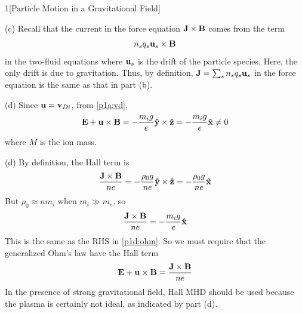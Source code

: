 \documentclass[12pt]{article}
\begin{document}
\begin{problem}{1}[Particle Motion in a Gravitational Field]
\begin{solution}
(c) Recall that the current in the force equation $\vb{J}\times\vb{B}$ comes
from the term
\begin{equation}
    n_sq_s\vb{u}_s\times\vb{B} 
\end{equation}
in the two-fluid equations where $\vb{u}_s$ is the drift of the particle
species. Here, the only drift is due to gravitation. Thus, by definition,
$\vb{J}=\sum_sn_sq_s\vb{u}_s$ in the force equation is the same as that in part 
(b).

(d) Since $\vb{u}=\vb{v}_{Di}$, from \eqref{p1a:vd},
\begin{equation}\label{p1d:ohm}
    \vb{E}+\vb{u}\times\vb{B}=-\frac{m_ig}{e}\vb{\hat{y}}\times\vb{\hat{z}}=-\frac{m_ig}{e}\vb{\hat{x}}
    \neq0
\end{equation}
where $M$ is the ion mass.

(d) By definition, the Hall term is
\begin{equation}
    \frac{\vb{J}\times\vb{B}}{ne}
    =-\frac{\rho_0g}{ne}\vb{\hat{y}}\times\vb{\hat{z}}
    =-\frac{\rho_0g}{ne}\vb{\hat{x}}
\end{equation}
But $\rho_0\approx nm_i$ when $m_i\gg m_e$, so
\begin{equation}
    \frac{\vb{J}\times\vb{B}}{ne}=-\frac{m_ig}{e}\vb{\hat{x}} 
\end{equation}
This is the same as the RHS in \eqref{p1d:ohm}. So we must require that the
generalized Ohm's law have the Hall term
\begin{equation}
    \vb{E}+\vb{u}\times\vb{B}=\frac{\vb{J}\times\vb{B}}{ne} 
\end{equation}
In the presence of strong gravitational field, Hall MHD should be used because
the plasma is certainly not ideal, as indicated by part (d).
\end{solution}
\end{problem}
\end{document}
